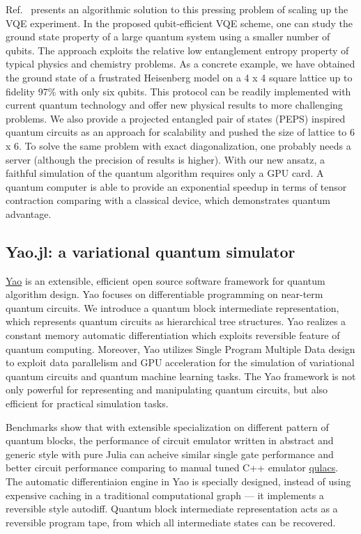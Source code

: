 \documentclass[aps,longbibliography,english,superscriptaddress]{revtex4-1}
\begin{document}
Ref.~\cite{Liu2019} presents an algorithmic solution to this pressing problem of scaling up the VQE experiment.  In the proposed qubit-efficient VQE scheme, one can study the ground state property of a large quantum system using a smaller number of qubits. The approach exploits the relative low entanglement entropy property of typical physics and chemistry problems. As a concrete example, we have obtained the ground state of a frustrated Heisenberg model on a 4 x 4 square lattice up to fidelity 97\% with only six qubits. This protocol can be readily implemented with current quantum technology and offer new physical results to more challenging problems. We also provide a projected entangled pair of states (PEPS) inspired quantum circuits as an approach for scalability and pushed the size of lattice to 6 x 6.
To solve the same problem with exact diagonalization, one probably needs a server (although the precision of results is higher). With our new ansatz, a faithful simulation of the quantum algorithm requires only a GPU card. A quantum computer is able to provide an exponential speedup in terms of tensor contraction comparing with a classical device, which demonstrates quantum advantage.

\subsection{Yao.jl: a variational quantum simulator}
\href{https://github.com/QuantumBFS/Yao.jl}{Yao} is an extensible, efficient open source software framework for quantum algorithm design. Yao focuses on differentiable programming on near-term quantum circuits. 
We introduce a quantum block intermediate representation, which represents quantum circuits as hierarchical tree structures. 
Yao realizes a constant memory automatic differentiation which exploits reversible feature of quantum computing. 
Moreover, Yao utilizes Single Program Multiple Data design to exploit data parallelism and GPU acceleration for the simulation of variational quantum circuits and quantum machine learning tasks. 
The Yao framework is not only powerful for representing and manipulating quantum circuits, but also efficient for practical simulation tasks. 

Benchmarks show that with extensible specialization on different pattern of quantum blocks, the performance of
circuit emulator written in abstract and generic style with pure Julia can acheive similar single gate performance and
better circuit performance comparing to manual tuned C++ emulator \href{https://github.com/qulacs/qulacs}{qulacs}.
The automatic differentiaion engine in Yao is specially designed, instead of using expensive caching in a traditional computational graph --- it implements a reversible style autodiff.
Quantum block intermediate representation acts as a reversible program tape, from which all intermediate states can be recovered.
\end{document}
